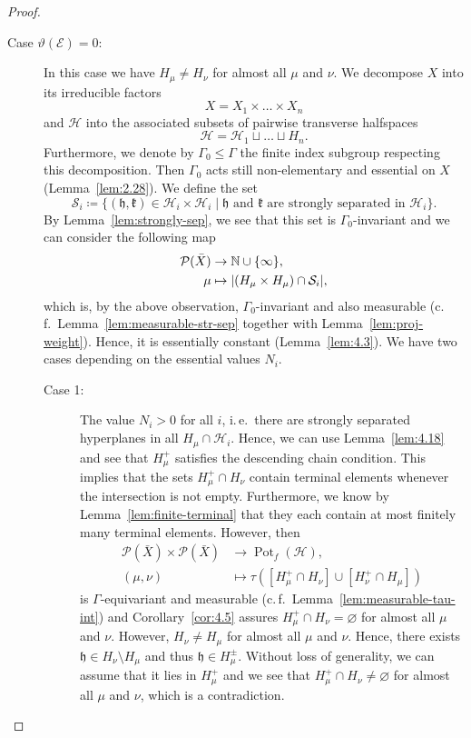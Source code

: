 \begin{proof}
\begin{description}
  \item[Case \(\vartheta(\mathcal{E})=0\):] In this case we have \(H_\mu \neq H_\nu\) for almost all \(\mu\) and \(\nu\). We decompose \(X\) into its irreducible factors
    \[
      X = X_1 \times \dots \times X_n
    \]
    and \(\mathcal{H}\) into the associated subsets of pairwise transverse halfspaces
    \[
      \mathcal{H} = \mathcal{H}_1 \sqcup \dots \sqcup H_n.
    \]
    Furthermore, we denote by \(\Gamma_0 \leq \Gamma\) the finite index subgroup respecting this decomposition. Then \(\Gamma_0\) acts still non-elementary and essential on \(X\) (Lemma~\ref{lem:2.28}). We define the set
    \[
      \mathcal{S}_i \coloneqq \{(\mathfrak{h}, \mathfrak{k}) \in \mathcal{H}_i \times \mathcal{H}_i \mid \mathfrak{h} \text{ and } \mathfrak{k} \text{ are strongly separated in } \mathcal{H}_i\}.
    \]
    By Lemma~\ref{lem:strongly-sep}, we see that this set is \(\Gamma_0\)-invariant and we can consider the following map
    \begin{align*}
      \mathcal{P}(\bar X) &\to \mathbb{N} \cup \{\infty\},\\
      \mu &\mapsto |(H_\mu \times H_\mu) \cap \mathcal{S}_i|,
    \end{align*}
    which is, by the above observation, \(\Gamma_0\)-invariant and also measurable (c.\,f.\ Lemma\ \ref{lem:measurable-str-sep} together with Lemma\ \ref{lem:proj-weight}). Hence, it is essentially constant (Lemma~\ref{lem:4.3}). We have two cases depending on the essential values \(N_i\).
    \begin{description}
    \item[Case 1:] The value \(N_i > 0\) for all \(i\), i.\,e.\ there are strongly separated hyperplanes in all \(H_\mu \cap \mathcal{H}_i\). Hence, we can use Lemma~\ref{lem:4.18} and see that \(H_\mu^+\) satisfies the descending chain condition. This implies that the sets \(H_\mu^+ \cap H_\nu\) contain terminal elements whenever the intersection is not empty. Furthermore, we know by Lemma~\ref{lem:finite-terminal} that they each contain at most finitely many terminal elements. However, then
      \begin{align*}
        \mathcal{P}(\bar X) \times \mathcal{P}(\bar X) &\to \operatorname{Pot}_f(\mathcal{H}),\\
        (\mu,\nu) &\mapsto \tau([H_\mu^+ \cap H_\nu] \cup [H_\nu^+ \cap H_\mu])
      \end{align*}
      is \(\Gamma\)-equivariant and measurable (c.\,f.\ Lemma~\ref{lem:measurable-tau-int}) and Corollary~\ref{cor:4.5} assures \(H_\mu^+ \cap H_\nu = \varnothing\) for almost all \(\mu\) and \(\nu\). However, \(H_\nu \neq H_\mu\) for almost all \(\mu\) and \(\nu\). Hence, there exists \(\mathfrak{h} \in H_\nu \setminus H_\mu\) and thus \(\mathfrak{h} \in H_\mu^\pm\). Without loss of generality, we can assume that it lies in \(H_\mu^+\) and we see that \(H_\mu^+ \cap H_\nu \neq \varnothing\) for almost all \(\mu\) and \(\nu\), which is a contradiction.

\end{description}
\end{description}
\end{proof}
